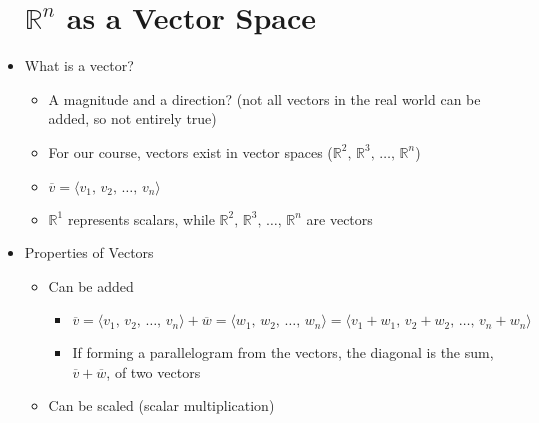 \begin{itemize}

  \section{$\mathbb{R}^n$ as a Vector Space}

  \item What is a vector?

    \begin{itemize}

      \item A magnitude and a direction? (not all vectors in the real world can be added, so not entirely true)

      \item For our course, vectors exist in vector spaces ($\mathbb{R}^2,\,\mathbb{R}^3,\,\dots,\,\mathbb{R}^n$)

      \item $\overline{v}=\langle v_1,\,v_2,\,\dots,\,v_n \rangle$

      \item $\mathbb{R}^1$ represents scalars, while $\mathbb{R}^2,\,\mathbb{R}^3,\,\dots,\,\mathbb{R}^n$ are vectors

    \end{itemize}

  \item Properties of Vectors

    \begin{itemize}

      \item Can be added

        \begin{itemize}

          \item $\overline{v}=\langle v_1,\,v_2,\,\dots,\,v_n \rangle + \overline{w}=\langle w_1,\,w_2,\,\dots,\,w_n \rangle = \langle v_1+w_1,\,v_2+w_2,\,\dots,\,v_n+w_n \rangle$

          \item If forming a parallelogram from the vectors, the diagonal is the sum, $\overline{v}+\overline{w}$, of two vectors

        \end{itemize}

      \item Can be scaled (scalar multiplication)

        \begin{itemize}


\end{itemize}
\end{itemize}
\end{itemize}
